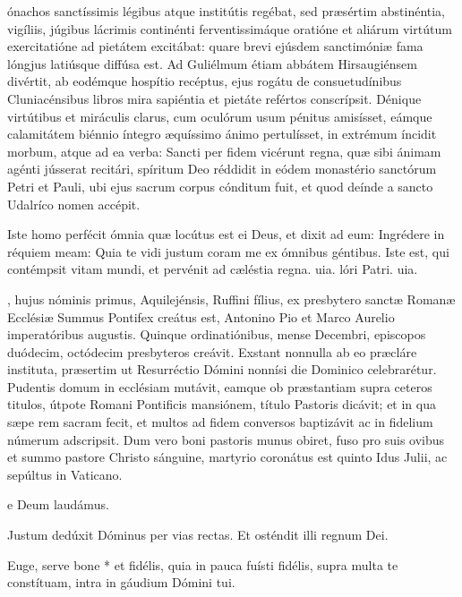 \documentclass[fontsize=9pt,paper=A6,twoside,BCOR=1mm,DIV=22,headinclude]{scrarticle}
\begin{document}
\begin{multicols}{2}
ónachos sanctíssimis légibus atque institútis regébat, sed præsértim abstinéntia, vigíliis, júgibus lácrimis continénti ferventissimáque oratióne et aliárum virtútum exercitatióne ad pietátem excitábat: quare brevi ejúsdem sanctimóniæ fama lóngjus latiúsque diffúsa est. Ad Guliélmum étiam abbátem Hirsaugiénsem divértit, ab eodémque hospítio recéptus, ejus rogátu de consuetudínibus Cluniacénsibus libros mira sapiéntia et pietáte refértos conscrípsit. Dénique virtútibus et miráculis clarus, cum oculórum usum pénitus amisísset, eámque calamitátem biénnio íntegro æquíssimo ánimo pertulísset, in extrémum íncidit morbum, atque ad ea verba: Sancti per fidem vicérunt regna, quæ sibi ánimam agénti jússerat recitári, spíritum Deo réddidit in eódem monastério sanctórum Petri et Pauli, ubi ejus sacrum corpus cónditum fuit, et quod deínde a sancto Udalríco nomen accépit.

\R Iste homo perfécit ómnia quæ locútus est ei Deus, et dixit ad eum: Ingrédere in réquiem meam: \red{*} Quia te vidi justum coram me ex ómnibus géntibus.
\V Iste est, qui contémpsit vitam mundi, et pervénit ad cæléstia regna. uia. lóri Patri. uia.


, hujus nóminis primus, Aquilejénsis, Ruffini fílius, ex presbytero sanctæ Romanæ Ecclésiæ Summus Pontifex creátus est, Antonino Pio et Marco Aurelio imperatóribus augustis.
Quinque ordinatiónibus, mense Decembri, episcopos duódecim, octódecim presbyteros creávit. Exstant nonnulla ab eo præcláre instituta, præsertim ut Resurréctio Dómini nonnísi die Dominico celebrarétur. Pudentis domum in ecclésiam mutávit, eamque ob præstantiam supra ceteros titulos, útpote Romani Pontificis mansiónem, título Pastoris dicávit; et in qua sæpe rem sacram fecit, et multos ad fidem conversos baptizávit ac in fidelium númerum adscripsit. Dum vero boni pastoris munus obiret, fuso pro suis ovibus et summo pastore Christo sánguine, martyrio coronátus est quinto Idus Julii, ac sepúltus in Vaticano.

e Deum laudámus.

{

\V Justum dedúxit Dóminus per vias rectas.
\R Et osténdit illi regnum Dei.

 Euge, serve bone * et fidélis, quia in pauca fuísti fidélis, supra multa te constítuam, intra in gáudium Dómini tui.

}
\end{multicols}
\end{document}
